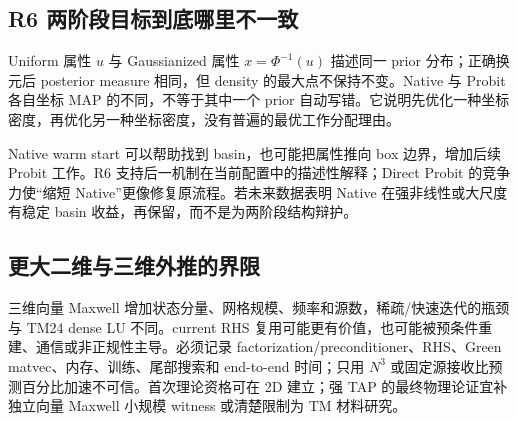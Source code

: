 \subsection{R6 两阶段目标到底哪里不一致}
Uniform 属性 $u$ 与 Gaussianized 属性 $x=\Phi^{-1}(u)$ 描述同一 prior 分布；正确换元后 posterior measure 相同，但 density 的最大点不保持不变。Native 与 Probit 各自坐标 MAP 的不同，不等于其中一个 prior 自动写错。它说明先优化一种坐标密度，再优化另一种坐标密度，没有普遍的最优工作分配理由。

Native warm start 可以帮助找到 basin，也可能把属性推向 box 边界，增加后续 Probit 工作。R6 支持后一机制在当前配置中的描述性解释；Direct Probit 的竞争力使“缩短 Native”更像修复原流程。若未来数据表明 Native 在强非线性或大尺度有稳定 basin 收益，再保留，而不是为两阶段结构辩护。

\subsection{更大二维与三维外推的界限}
三维向量 Maxwell 增加状态分量、网格规模、频率和源数，稀疏/快速迭代的瓶颈与 TM24 dense LU 不同。current RHS 复用可能更有价值，也可能被预条件重建、通信或非正规性主导。必须记录 factorization/preconditioner、RHS、Green matvec、内存、训练、尾部搜索和 end-to-end 时间；只用 $N^3$ 或固定源接收比预测百分比加速不可信。首次理论资格可在 2D 建立；强 TAP 的最终物理论证宜补独立向量 Maxwell 小规模 witness 或清楚限制为 TM 材料研究。

